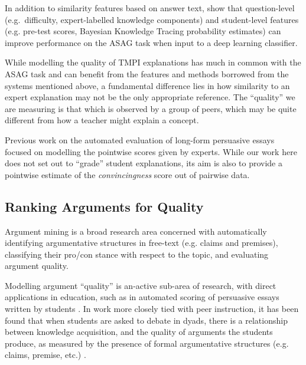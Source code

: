 \documentclass[notitlepage,12pt]{jedm}
\begin{document}
In addition to similarity features based on answer text, 
 show that question-level (e.g.\ difficulty, 
expert-labelled knowledge components) and student-level features (e.g. pre-test 
scores, Bayesian Knowledge Tracing probability estimates) can improve 
performance on the ASAG task when input to a deep learning classifier.

While modelling the quality of TMPI explanations has much in common with the 
ASAG task and can benefit from the features and methods borrowed from the systems 
mentioned above, a fundamental difference lies in how similarity to an expert 
explanation may not be the only appropriate reference.
The ``quality'' we are measuring is that which is observed by a group of peers, 
which may be quite different from how a teacher might explain a concept.


Previous work on the automated evaluation of long-form persuasive essays 
\cite{ghosh_coarse-grained_2016,klebanov_argumentation_2016,nguyen_argument_2018}
focused on modelling the pointwise scores given by experts.
While our work here does not set out to ``grade'' student explanations, its aim
is also to provide a pointwise estimate of the
\textit{convincingness} score out of pairwise data.


\subsection{Ranking Arguments for Quality}\label{sec:related_work:arg_quality}

Argument mining is a broad research area concerned with automatically 
identifying argumentative structures in free-text (e.g. claims and premises), 
classifying their pro/con stance with respect to the topic, and evaluating 
argument quality.

Modelling argument ``quality'' is an-active sub-area of research, with direct 
applications in education, such as in automated scoring of persuasive essays 
written by students \cite{persing_modeling_2015,nguyen_argument_2018}.
In work more closely tied with peer instruction, it has been found that when 
students are asked to debate in dyads, there is a relationship between  
knowledge acquisition, and the quality of arguments the students produce, as 
measured by the presence of formal argumentative structures (e.g. claims, 
premise, etc.) \cite{garcia-mila_effect_2013}.
\end{document}
